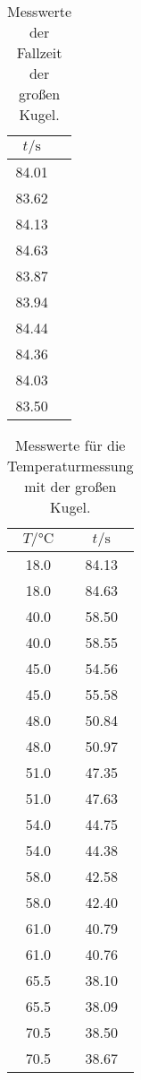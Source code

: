 \begin{table}[h]
  \centering
  \caption{Messwerte der Fallzeit der großen Kugel.}
  \label{tab:grKugel}
  \begin{tabular}{c c}
    \toprule
    $t/\si{\second}$ \\
    \midrule
    84.01 \\
    83.62 \\
    84.13 \\
    84.63 \\
    83.87 \\
    83.94 \\
    84.44 \\
    84.36 \\
    84.03 \\
    83.50 \\
    \bottomrule
  \end{tabular}
\end{table}

\begin{table}[h]
  \centering
  \caption{Messwerte für die Temperaturmessung mit der großen Kugel.}
  \label{tab:Viskovgl}
  \begin{tabular}{c c}
    \toprule
    $T/\si{\celsius}$ & $t/\si{\second}$ \\
    \midrule
    18.0 & 84.13 \\
    18.0 & 84.63 \\
    40.0 & 58.50 \\
    40.0 & 58.55 \\
    45.0 & 54.56 \\
    45.0 & 55.58 \\
    48.0 & 50.84 \\
    48.0 & 50.97 \\
    51.0 & 47.35 \\
    51.0 & 47.63 \\
    54.0 & 44.75 \\
    54.0 & 44.38 \\
    58.0 & 42.58 \\
    58.0 & 42.40 \\
    61.0 & 40.79 \\
    61.0 & 40.76 \\
    65.5 & 38.10 \\
    65.5 & 38.09 \\
    70.5 & 38.50 \\
    70.5 & 38.67 \\
    \bottomrule
  \end{tabular}
\end{table}

